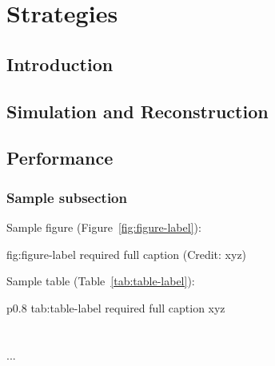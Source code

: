 \chapter{Strategies}
\label{ch:exec-summ-strat}

\section{Introduction}
\label{sec:exec-summ-strat-intro}

\section{Simulation and Reconstruction}
\label{sec:exec-summ-strat-simreco}


\section{Performance}
\label{sec:exec-summ-strat-perf}



\subsection{Sample subsection}
\label{sec:exec-summ-fix}

Sample figure (Figure~\ref{fig:figure-label}):

\begin{dunefigure}{fig:figure-label}
{required full caption (Credit: xyz)}
\end{dunefigure}

Sample table (Table~\ref{tab:table-label}):

\begin{dunetable}
{p{0.8\textwidth}}
{tab:table-label}
{required full caption}   
xyz  \\ \toprowrule
  \\ \colhline
   \\ \colhline
 ...\\ 
\end{dunetable}
